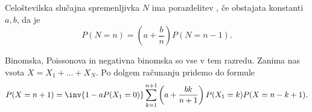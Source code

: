 

\begin{definicija}
  Celoštevilska slučajna spremenljivka $N$ ima porazdelitev , če obstajata konstanti $a,b$, da je
  \[
	P(N = n) = (a + \frac{b}{n}) P(N = n-1).
  \]
\end{definicija}

Binomska, Poissonova in negativna binomska so vse v tem razredu.
Zanima nas vsota $X = X_1 + \ldots + X_N$.
Po dolgem računanju pridemo do formule
\[
  P(X = n+1) = \inv{1 - a P(X_1 = 0)} \sum_{k=1}^{n+1} \left( a + \frac{bk}{n+1}
  \right) P(X_1 = k) P(X = n-k+1).
\]


